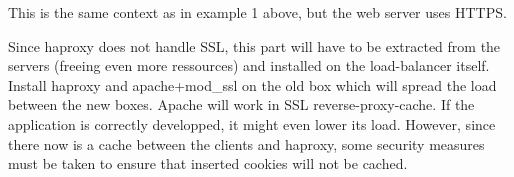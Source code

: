 This is the same context as in example 1 above, but the web
server uses HTTPS.

\begin{figure}[!h]
  \centering

\end{figure}

Since haproxy does not handle SSL, this part will have to be extracted from the
servers (freeing even more ressources) and installed on the load-balancer
itself. Install haproxy and apache+mod\_ssl on the old box which will spread the
load between the new boxes. Apache will work in SSL reverse-proxy-cache. If the
application is correctly developped, it might even lower its load. However,
since there now is a cache between the clients and haproxy, some security
measures must be taken to ensure that inserted cookies will not be cached.

